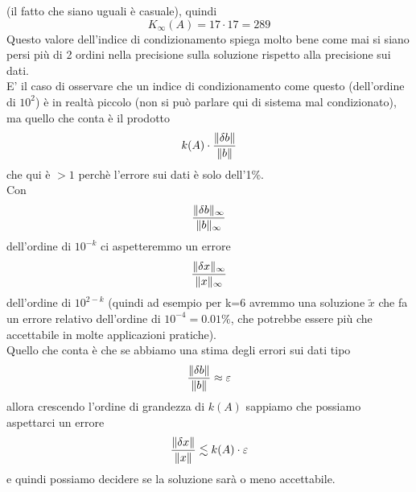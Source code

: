 (il fatto che siano uguali è casuale), quindi
\begin{equation*}
    K_\infty(A) = 17 \cdot 17 = 289
\end{equation*}
Questo valore dell'indice di condizionamento spiega molto bene come mai si siano persi più di 2 ordini nella precisione sulla soluzione rispetto alla precisione sui dati.\\
E' il caso di osservare che un indice di condizionamento come questo (dell'ordine di $10^2$) è in realtà piccolo (non si può parlare qui di sistema mal condizionato), ma quello che conta è il prodotto
\begin{equation*}
   k(A)\cdot \frac{\lVert\delta b\rVert}{\lVert b\rVert}
\end{equation*} che qui è $>1$ perchè l'errore sui dati è solo dell'1\%.\\Con 
\begin{equation*}
    \frac{\lVert\delta b\rVert_\infty}{\lVert b\rVert_\infty}
\end{equation*} 
dell'ordine di $10^{-k}$ ci aspetteremmo un errore 
\begin{equation*}
    \frac{\lVert\delta x\rVert_\infty}{\lVert x\rVert_\infty} 
\end{equation*}dell'ordine di $10^{2-k}$ (quindi ad esempio per k=6 avremmo una soluzione $\tilde{x}$ che fa un errore relativo dell'ordine di $10^{-4}=0.01\%$, che potrebbe essere più che accettabile in molte applicazioni pratiche).\\
Quello che conta è che se abbiamo una stima degli errori sui dati tipo
\begin{equation*}
    \frac{\lVert\delta b\rVert}{\lVert b\rVert}\approx \varepsilon
\end{equation*} allora crescendo l'ordine di grandezza di $k(A)$ sappiamo che possiamo aspettarci un errore 
\begin{equation*}
    \frac{\lVert\delta x\rVert}{\lVert x\rVert}\lesssim k(A)\cdot\varepsilon
\end{equation*}
e quindi possiamo decidere se la soluzione sarà o meno accettabile.

